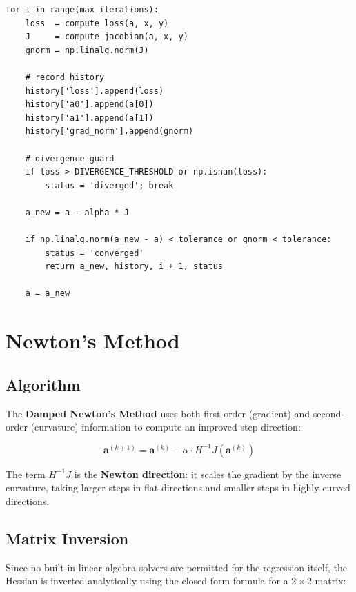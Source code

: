 \documentclass[12pt,a4paper]{article}
\begin{document}
\begin{lstlisting}[caption={Core GD update loop (gradient\_descent.py)}]
for i in range(max_iterations):
    loss  = compute_loss(a, x, y)
    J     = compute_jacobian(a, x, y)
    gnorm = np.linalg.norm(J)

    # record history
    history['loss'].append(loss)
    history['a0'].append(a[0])
    history['a1'].append(a[1])
    history['grad_norm'].append(gnorm)

    # divergence guard
    if loss > DIVERGENCE_THRESHOLD or np.isnan(loss):
        status = 'diverged'; break

    a_new = a - alpha * J

    if np.linalg.norm(a_new - a) < tolerance or gnorm < tolerance:
        status = 'converged'
        return a_new, history, i + 1, status

    a = a_new
\end{lstlisting}

\section{Newton's Method}
\label{sec:newton}

\subsection{Algorithm}

The \textbf{Damped Newton's Method} uses both first-order (gradient) and second-order
(curvature) information to compute an improved step direction:

\begin{equation}
    \mathbf{a}^{(k+1)} = \mathbf{a}^{(k)} - \alpha \cdot H^{-1} J\!\left(\mathbf{a}^{(k)}\right)
\end{equation}

The term $H^{-1}J$ is the \textbf{Newton direction}: it scales the gradient by the
inverse curvature, taking larger steps in flat directions and smaller steps in highly
curved directions.

\subsection{Matrix Inversion}

Since no built-in linear algebra solvers are permitted for the regression itself, the
Hessian is inverted analytically using the closed-form formula for a $2 \times 2$ matrix:
\end{document}
